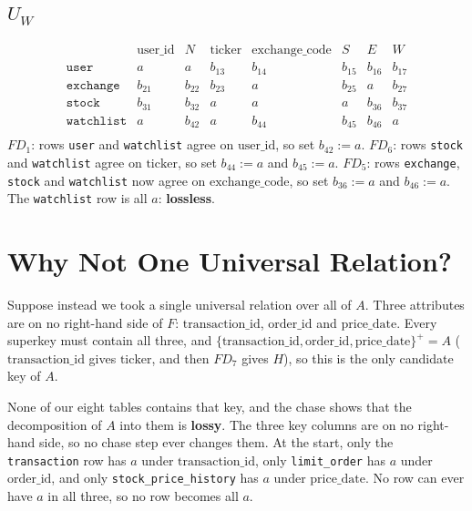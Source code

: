 \documentclass{article}
\newcommand{\at}[1]{\text{#1}}
\begin{document}
\subsection{$U_W$}

\[
\begin{array}{l|ccccccc}
  & \at{user\_id} & N & \at{ticker} & \at{exchange\_code} & S & E & W \\
  \hline
  \texttt{user}      & a      & a      & b_{13} & b_{14} & b_{15} & b_{16} & b_{17} \\
  \texttt{exchange}  & b_{21} & b_{22} & b_{23} & a      & b_{25} & a      & b_{27} \\
  \texttt{stock}     & b_{31} & b_{32} & a      & a      & a      & b_{36} & b_{37} \\
  \texttt{watchlist} & a      & b_{42} & a      & b_{44} & b_{45} & b_{46} & a      \\
\end{array}
\]
$FD_1$: rows \texttt{user} and \texttt{watchlist} agree on $\at{user\_id}$, so set $b_{42} := a$. $FD_6$: rows \texttt{stock} and \texttt{watchlist} agree on $\at{ticker}$, so set $b_{44} := a$ and $b_{45} := a$. $FD_5$: rows \texttt{exchange}, \texttt{stock} and \texttt{watchlist} now agree on $\at{exchange\_code}$, so set $b_{36} := a$ and $b_{46} := a$. The \texttt{watchlist} row is all $a$: \textbf{lossless}.

\section{Why Not One Universal Relation?}\label{sec:single}

Suppose instead we took a single universal relation over all of $A$. Three attributes are on no right-hand side of $F$: $\at{transaction\_id}$, $\at{order\_id}$ and $\at{price\_date}$. Every superkey must contain all three, and $\{\at{transaction\_id}, \at{order\_id}, \at{price\_date}\}^+ = A$ ($\at{transaction\_id}$ gives $\at{ticker}$, and then $FD_7$ gives $H$), so this is the only candidate key of $A$.

None of our eight tables contains that key, and the chase shows that the decomposition of $A$ into them is \textbf{lossy}. The three key columns are on no right-hand side, so no chase step ever changes them. At the start, only the \texttt{transaction} row has $a$ under $\at{transaction\_id}$, only \texttt{limit\_order} has $a$ under $\at{order\_id}$, and only \texttt{stock\_price\_history} has $a$ under $\at{price\_date}$. No row can ever have $a$ in all three, so no row becomes all $a$.
\end{document}
